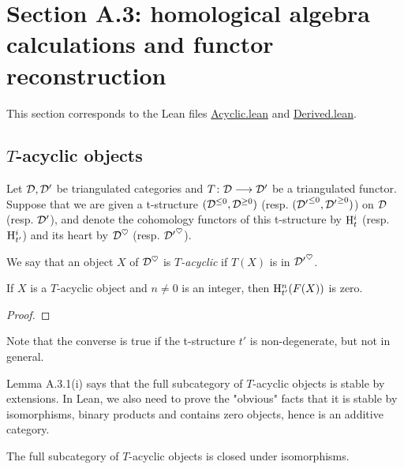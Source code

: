 \section{Section A.3: homological algebra calculations and functor reconstruction}

This section corresponds to the Lean files \url{Acyclic.lean} and \url{Derived.lean}.

\subsection{$T$-acyclic objects}

Let $\mathcal{D},\mathcal{D}'$ be triangulated categories and $T\colon \mathcal{D}\longrightarrow\mathcal{D}'$ be a triangulated functor. Suppose that we are given a t-structure 
$(\mathcal{D}^{\leq 0},\mathcal{D}^{\geq 0})$ (resp. $({\mathcal{D}'}^{\leq 0},{\mathcal{D}'}^{\geq 0})$) on $\mathcal{D}$ (resp. $\mathcal{D}'$), and denote the cohomology functors of 
this t-structure by $\mathrm{H}^i_t$ (resp. $\mathrm{H}^i_{t'}$) and its heart by $\mathcal{D}^\heartsuit$ (resp. ${\mathcal{D}'}^\heartsuit$).

\begin{definition}
\label{def-acyclic}

We say that an object $X$ of $\mathcal{D}^\heartsuit$ is \emph{$T$-acyclic} if $T(X)$ is in ${\mathcal{D}'}^\heartsuit$.

\end{definition}

\begin{lemma}
\label{prop-acyclic-H}
\leanok 
{}
If $X$ is a $T$-acyclic object and $n\ne 0$ is an integer, then $\mathrm{H}^n_{t'}(F(X))$ is zero.

\end{lemma}

\begin{proof}
\leanok
\end{proof}

Note that the converse is true if the t-structure $t'$ is non-degenerate, but not in general.

Lemma A.3.1(i) says that the full subcategory of $T$-acyclic objects is stable by extensions. In Lean, we 
also need to prove the "obvious" facts that it is stable by isomorphisms, binary products and contains zero objects,
hence is an additive category.

\begin{lemma}
\label{prop-acyclic-iso}
\leanok 
{}
The full subcategory of $T$-acyclic objects is closed under isomorphisms.

\end{lemma}

